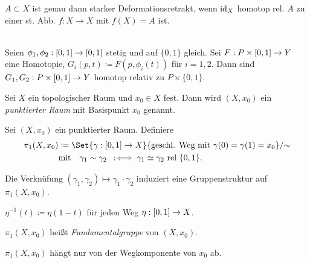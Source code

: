 \documentclass{cheat-sheet}
\newcommand{\rel}{\text{ rel }} %
\begin{document}
\begin{bem}
  $A \subset X$ ist genau dann starker Deformationsretrakt, wenn $\mathrm{id}_X$ homotop rel. $A$ zu einer st. Abb. $f : X \to X$ mit $f(X) = A$ ist.
\end{bem}

\begin{lem}[Reparametrisierungslemma]\mbox{}\\
  Seien $\phi_1, \phi_2 : \left[ 0, 1 \right] \to \left[ 0, 1 \right]$ stetig und auf $\{ 0, 1 \}$ gleich. Sei $F : P \times \left[ 0, 1 \right] \to Y$ eine Homotopie, $G_i(p, t) \coloneqq F(p, \phi_i(t))$ für $i = 1,2$. Dann sind $G_1, G_2 : P \times \left[ 0, 1 \right] \to Y$ homotop relativ zu $P \times \{ 0, 1 \}$.
\end{lem}

\begin{defn}
  Sei $X$ ein topologischer Raum und $x_0 \in X$ fest. Dann wird $(X, x_0)$ ein \emph{punktierter Raum} mit Basispunkt $x_0$ genannt.
\end{defn}

\begin{defn}
  Sei $(X, x_0)$ ein punktierter Raum. Definiere
  \begin{align*}
    \pi_1(X, x_0) &\coloneqq \Set{ \gamma : \I \to X }{ \text{geschl. Weg mit } \gamma(0) = \gamma(1) = x_0 } / {\sim}\\
    & \text{mit} \quad \gamma_1 \sim \gamma_2 \coloniff \gamma_1 \simeq \gamma_2 \rel \{0,1\}.
  \end{align*}
\end{defn}

\begin{prop}
  Die Verknüfung $(\gamma_1, \gamma_2) \mapsto \gamma_1 \cdot \gamma_2$ induziert eine Gruppenstruktur auf $\pi_1(X, x_0)$.
\end{prop}

\begin{nota}
  $\eta^{-1}(t) \coloneqq \eta(1-t)$ für jeden Weg $\eta : \left[ 0, 1 \right] \to X$.
\end{nota}

\begin{defn}
  $\pi_1(X, x_0)$ heißt \emph{Fundamentalgruppe} von $(X, x_0)$.
\end{defn}


\begin{bem}
  $\pi_1(X, x_0)$ hängt nur von der Wegkomponente von $x_0$ ab.
\end{bem}
\end{document}
